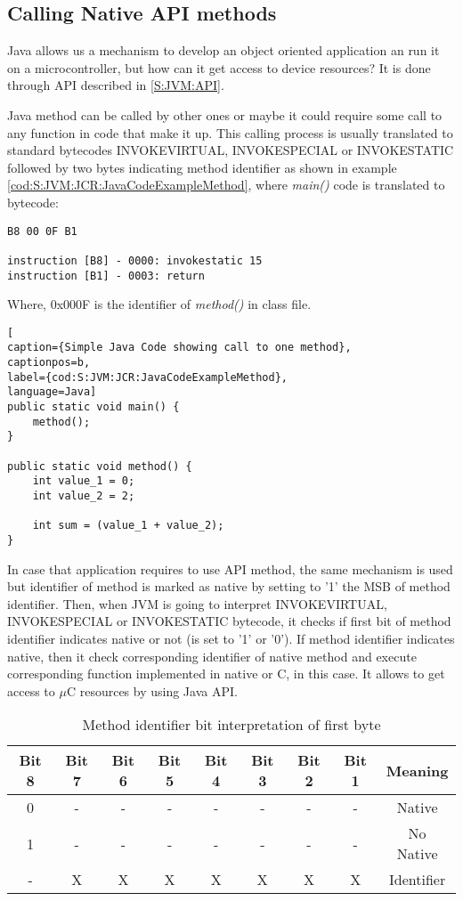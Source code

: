 \subsection{Calling Native API methods}\label{SS:JVM:JCR:NativeAPI}
Java allows us a mechanism to develop an object oriented application an run it on a microcontroller, but how can it get access to device resources? It is done through API described in \ref{S:JVM:API}.

Java method can be called by other ones or maybe it could require some call to any function in code that make it up. This calling process is usually translated to standard bytecodes INVOKEVIRTUAL, INVOKESPECIAL or INVOKESTATIC followed by two bytes indicating method identifier as shown in example \ref{cod:S:JVM:JCR:JavaCodeExampleMethod}, where \textit{main()} code is translated to bytecode:

\medskip
\begin{lstlisting}
B8 00 0F B1

instruction [B8] - 0000: invokestatic 15
instruction [B1] - 0003: return
\end{lstlisting}
\medskip

Where, 0x000F is the identifier of \textit{method()} in class file.

\medskip
\begin{lstlisting}[
caption={Simple Java Code showing call to one method},
captionpos=b,
label={cod:S:JVM:JCR:JavaCodeExampleMethod},
language=Java]
public static void main() {
    method();
}

public static void method() {
    int value_1 = 0;
    int value_2 = 2;

    int sum = (value_1 + value_2);
}
\end{lstlisting}
\medskip

In case that application requires to use API method, the same mechanism is used but identifier of method is marked as native by setting to '1' the MSB of method identifier. Then, when JVM is going to interpret INVOKEVIRTUAL, INVOKESPECIAL or INVOKESTATIC bytecode, it checks if first bit of method identifier indicates native or not (is set to '1' or '0'). If method identifier indicates native, then it check corresponding identifier of native method and execute corresponding function implemented in native or C, in this case. It allows to get access to $\mu$C resources by using Java API.

\begin{table}[!htb]
\centering
\begin{tabular}{|c|c|c|c|c|c|c|c|c|}
\hline 
Bit 8 & Bit 7 & Bit 6 & Bit 5 & Bit 4 & Bit 3 & Bit 2 & Bit 1 & Meaning \\ 
\hline 
0 & - & - & - & - & - & - & - & Native \\ 
\hline 
1 & - & - & - & - & - & - & - & No Native \\ 
\hline 
- & X & X & X & X & X & X & X & Identifier \\ 
\hline 
\end{tabular}
\caption{Method identifier bit interpretation of first byte}
\label{tab:SS:JVM:JCR:TransBytecodes}
\end{table}

